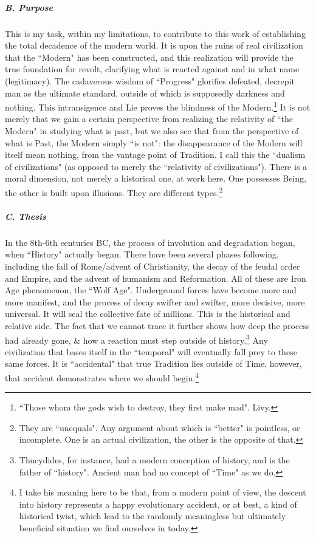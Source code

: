 \subparagraph{B. Purpose}
This is my task, within my limitations, to contribute to this work of establishing the total decadence of the modern world. It is upon the ruins of real civilization that the ``Modern" has been constructed, and this realization will provide the true foundation for revolt, clarifying what is reacted against and in what name (legitimacy). The cadaverous wisdom of ``Progress" glorifies defeated, decrepit man as the ultimate standard, outside of which is supposedly darkness and nothing. This intransigence and Lie proves the blindness of the Modern.\footnote{``Those whom the gods wish to destroy, they first make mad". Livy.} It is not merely that we gain a certain perspective from realizing the relativity of ``the Modern" in studying what is past, but we also see that from the perspective of what is Past, the Modern simply ``is not": the disappearance of the Modern will itself mean nothing, from the vantage point of Tradition. I call this the ``dualism of civilizations" (as opposed to merely the ``relativity of civilizations"). There is a moral dimension, not merely a historical one, at work here. One possesses Being, the other is built upon illusions. They are different types.\footnote{They are ``unequals". Any argument about which is ``better" is pointless, or incomplete. One is an actual civilization, the other is the opposite of that.}

\subparagraph{C. Thesis}
In the 8th-6th centuries BC, the process of involution and degradation began, when ``History" actually began. There have been several phases following, including the fall of Rome/advent of Christianity, the decay of the feudal order and Empire, and the advent of humanism and Reformation. All of these are Iron Age phenomenon, the ``Wolf Age". Underground forces have become more and more manifest, and the process of decay swifter and swifter, more decisive, more universal. It will seal the collective fate of millions. This is the historical and relative side. The fact that we cannot trace it further shows how deep the process had already gone, \& how a reaction must step outside of history.\footnote{Thucydides, for instance, had a modern conception of history, and is the father of ``history". Ancient man had no concept of ``Time" as we do.} Any civilization that bases itself in the ``temporal" will eventually fall prey to these same forces. It is ``accidental" that true Tradition lies outside of Time, however, that accident demonstrates where we should begin.\footnote{I take his meaning here to be that, from a modern point of view, the descent into history represents a happy evolutionary accident, or at best, a kind of historical twist, which lead to the randomly meaningless but ultimately beneficial situation we find ourselves in today.}

